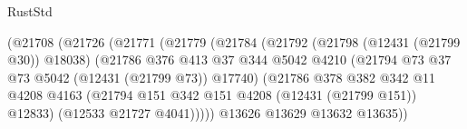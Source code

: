 \begin{lexlean}{RustStd}
\begin{coremodule}
                                            (@21708
                                              (@21726
                                                (@21771
                                                  (@21779
                                                    (@21784
                                                      (@21792
                                                        (@21798 (@12431 (@21799 @30)) @18038)
                                                        (@21786
                                                          @376
                                                          @413
                                                          @37
                                                          @344
                                                          @5042
                                                          @4210
                                                          (@21794
                                                            @73
                                                            @37
                                                            @73
                                                            @5042
                                                            (@12431 (@21799 @73))
                                                            @17740)
                                                          (@21786
                                                            @378
                                                            @382
                                                            @342
                                                            @11
                                                            @4208
                                                            @4163
                                                            (@21794
                                                              @151
                                                              @342
                                                              @151
                                                              @4208
                                                              (@12431 (@21799 @151))
                                                              @12833)
                                                            (@12533 @21727 @4041)))))
                                                    @13626
                                                    @13629
                                                    @13632
                                                    @13635))

\end{coremodule}
\end{lexlean}
